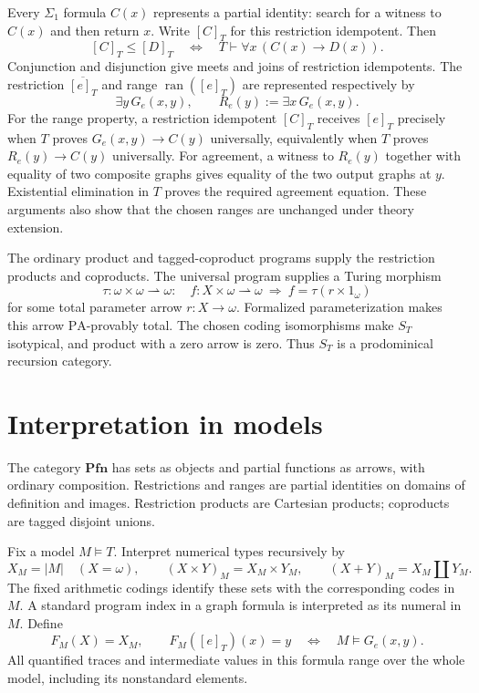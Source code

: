 \documentclass[11pt]{article}
\newcommand{\PA}{\mathrm{PA}}
\newcommand{\Pfn}{\mathbf{Pfn}}
\newcommand{\ran}{\operatorname{ran}}
\begin{document}
Every $\Sigma_1$ formula $C(x)$ represents a partial identity: search for
a witness to $C(x)$ and then return $x$. Write $[C]_T$ for this
restriction idempotent.
Then
\begin{equation}\label{eq:domain-order}
 [C]_T\le[D]_T
 \quad\Longleftrightarrow\quad
 T\vdash\forall x\,(C(x)\longrightarrow D(x)).
\end{equation}
Conjunction and disjunction give meets and joins of restriction
idempotents. The restriction $\overline{[e]_T}$ and range $\ran([e]_T)$
are represented respectively by
\[
 \exists y\,G_e(x,y),\qquad
 R_e(y):=\exists x\,G_e(x,y).
\]
For the range property, a restriction idempotent $[C]_T$ receives
$[e]_T$ precisely when
$T$ proves $G_e(x,y)\to C(y)$ universally, equivalently when
$T$ proves $R_e(y)\to C(y)$ universally. For agreement, a witness to
$R_e(y)$ together with equality of two composite graphs gives equality
of the two output graphs at $y$. Existential elimination in $T$ proves
the required agreement equation. These arguments also show that the
chosen ranges are unchanged under theory extension.

The ordinary product and tagged-coproduct programs supply the restriction
products and coproducts. The universal program supplies a Turing morphism
\[
 \tau:\omega\times\omega\rightharpoonup\omega:
 \quad f:X\times\omega\rightharpoonup\omega
 \ \Longrightarrow\ 
 f=\tau(r\times1_\omega)
\]
for some total parameter arrow $r:X\to\omega$. Formalized
parameterization makes this arrow $\PA$-provably total. The chosen coding
isomorphisms make $S_T$ isotypical, and product with a zero arrow is zero.
Thus $S_T$ is a prodominical recursion category.

\section{Interpretation in models}\label{sec:models}

The category $\Pfn$ has sets as objects and partial functions as arrows,
with ordinary composition. Restrictions and ranges are partial identities
on domains of definition and images. Restriction products are Cartesian products;
coproducts are tagged disjoint unions.

Fix a model $M\models T$. Interpret numerical types recursively by
\[
 X_M=|M|\quad(X=\omega),\qquad
 (X\times Y)_M=X_M\times Y_M,\qquad
 (X+Y)_M=X_M\amalg Y_M.
\]
The fixed arithmetic codings identify these sets with the corresponding
codes in $M$. A standard program index in a graph formula is interpreted
as its numeral in $M$. Define
\begin{equation}\label{eq:model-functor}
 F_M(X)=X_M,\qquad
 F_M([e]_T)(x)=y
 \quad\Longleftrightarrow\quad M\models G_e(x,y).
\end{equation}
All quantified traces and intermediate values in this formula range over
the whole model, including its nonstandard elements.
\end{document}
